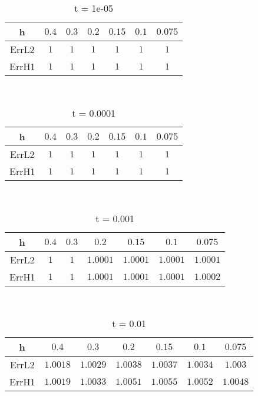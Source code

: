 \documentclass{standalone}
\begin{document}
\clearpage
\hfill \\ 
\begin{table}[!h]
\centering
\begin{tabular}{ | c | c | c | c | c | c | c | }
\hline
h	&	$0.4$ & $0.3$ & $0.2$ & $0.15$ & $0.1$ & $0.075$ \\ \hline
ErrL2	&	$1$ & $1$ & $1$ & $1$ & $1$ & $1$ \\ \hline
ErrH1	&	$1$ & $1$ & $1$ & $1$ & $1$ & $1$ \\ \hline
\end{tabular}
\caption{t = 1e-05 }
\end{table}

\hfill \\ 
\begin{table}[!h]
\centering
\begin{tabular}{ | c | c | c | c | c | c | c | }
\hline
h	&	$0.4$ & $0.3$ & $0.2$ & $0.15$ & $0.1$ & $0.075$ \\ \hline
ErrL2	&	$1$ & $1$ & $1$ & $1$ & $1$ & $1$ \\ \hline
ErrH1	&	$1$ & $1$ & $1$ & $1$ & $1$ & $1$ \\ \hline
\end{tabular}
\caption{t = 0.0001 }
\end{table}

\hfill \\ 
\begin{table}[!h]
\centering
\begin{tabular}{ | c | c | c | c | c | c | c | }
\hline
h	&	$0.4$ & $0.3$ & $0.2$ & $0.15$ & $0.1$ & $0.075$ \\ \hline
ErrL2	&	$1$ & $1$ & $1.0001$ & $1.0001$ & $1.0001$ & $1.0001$ \\ \hline
ErrH1	&	$1$ & $1$ & $1.0001$ & $1.0001$ & $1.0001$ & $1.0002$ \\ \hline
\end{tabular}
\caption{t = 0.001 }
\end{table}

\hfill \\ 
\begin{table}[!h]
\centering
\begin{tabular}{ | c | c | c | c | c | c | c | }
\hline
h	&	$0.4$ & $0.3$ & $0.2$ & $0.15$ & $0.1$ & $0.075$ \\ \hline
ErrL2	&	$1.0018$ & $1.0029$ & $1.0038$ & $1.0037$ & $1.0034$ & $1.003$ \\ \hline
ErrH1	&	$1.0019$ & $1.0033$ & $1.0051$ & $1.0055$ & $1.0052$ & $1.0048$ \\ \hline
\end{tabular}
\caption{t = 0.01 }
\end{table}


\clearpage
\end{document}
